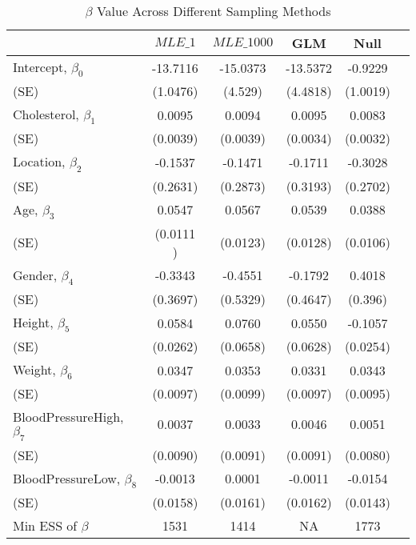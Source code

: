 \documentclass[paper=letterpaper,fontsize=12pt,twoside,american]{scrartcl}
\begin{document}
\begin{table}[H]
\renewcommand{\arraystretch}{1.2}
\setlength{\tabcolsep}{12pt}
\caption*{$\beta$ Value Across Different Sampling Methods}
\centering
\footnotesize
\begin{tabular}{l*{5}{|c}}
\hline\hline			 & $MLE\_1$ & $MLE\_1000$ & GLM      &Null\\\hline
Intercept, $\beta_{0}$   & -13.7116   &  -15.0373  & -13.5372 & -0.9229\\ 
\quad\qquad(SE)		     &  (1.0476)  & (4.529)   & (4.4818)   &(1.0019)\\\hline
Cholesterol, $\beta_{1}$ &  0.0095    & 0.0094    &	  0.0095   & 0.0083	\\ 
\quad\qquad(SE)			 &	(0.0039)  & (0.0039)  & (0.0034)  &(0.0032) \\\hline
Location, $\beta_{2}$	 &  -0.1537   & -0.1471   &	 -0.1711   &-0.3028 	\\ 
\quad\qquad(SE)			 & (0.2631)   & (0.2873)  &	(0.3193)   &(0.2702)\\\hline
Age, $\beta_{3}$ 		&  0.0547     &  0.0567   &	0.0539 	  &0.0388\\ 
\quad\qquad(SE)			& (0.0111 )   & (0.0123)  & (0.0128)  &(0.0106)\\\hline
Gender, $\beta_{4}$		&  -0.3343   &  -0.4551   &	 -0.1792   &0.4018	\\ 
\quad\qquad(SE)			& (0.3697)    &  (0.5329) & (0.4647)   &(0.396)\\\hline
Height, $\beta_{5}$		& 0.0584      &  0.0760   &   0.0550  & -0.1057\\ 
\quad\qquad(SE)			& (0.0262)    &  (0.0658) &  (0.0628) &(0.0254)\\\hline
Weight, $\beta_{6}$		& 0.0347      & 0.0353    &	 0.0331	 &0.0343\\ 
\quad\qquad(SE)			& (0.0097)    &  (0.0099) & (0.0097) &(0.0095)\\\hline
BloodPressureHigh, $\beta_{7}$& 0.0037 & 0.0033   &	0.0046	 &0.0051\\ 
\quad\qquad(SE)			&  (0.0090)   &  (0.0091) & (0.0091)  &(0.0080)\\\hline
BloodPressureLow, $\beta_{8}$& -0.0013&  0.0001  &	-0.0011   & -0.0154	\\ 
\quad\qquad(SE)			& (0.0158)    & (0.0161) & (0.0162)   &(0.0143)\\\hline
\hline\hline
Min ESS of $\beta$ 		&1531 	&1414	&NA 	&1773 \\\hline
\end{tabular}
\end{table}
\end{document}
